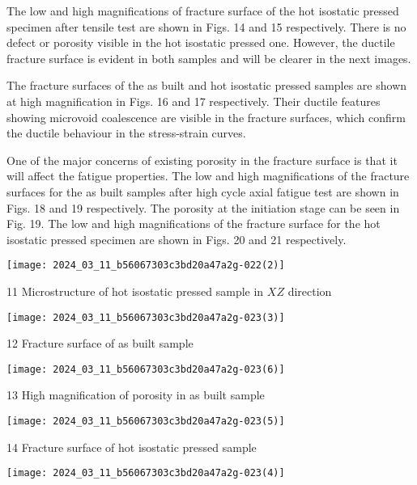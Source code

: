 \documentclass[10pt]{article}
\begin{document}
The low and high magnifications of fracture surface of the hot isostatic pressed specimen after tensile test are shown in Figs. 14 and 15 respectively. There is no defect or porosity visible in the hot isostatic pressed one. However, the ductile fracture surface is evident in both samples and will be clearer in the next images.

The fracture surfaces of the as built and hot isostatic pressed samples are shown at high magnification in Figs. 16 and 17 respectively. Their ductile features showing microvoid coalescence are visible in the fracture surfaces, which confirm the ductile behaviour in the stress-strain curves.

One of the major concerns of existing porosity in the fracture surface is that it will affect the fatigue properties. The low and high magnifications of the fracture surfaces for the as built samples after high cycle axial fatigue test are shown in Figs. 18 and 19 respectively. The porosity at the initiation stage can be seen in Fig. 19. The low and high magnifications of the fracture surface for the hot isostatic pressed specimen are shown in Figs. 20 and 21 respectively.

\begin{center}
\texttt{[image: 2024\_03\_11\_b56067303c3bd20a47a2g-022(2)]}
\end{center}

11 Microstructure of hot isostatic pressed sample in $X Z$ direction

\begin{center}
\texttt{[image: 2024\_03\_11\_b56067303c3bd20a47a2g-023(3)]}
\end{center}

12 Fracture surface of as built sample

\begin{center}
\texttt{[image: 2024\_03\_11\_b56067303c3bd20a47a2g-023(6)]}
\end{center}

13 High magnification of porosity in as built sample

\begin{center}
\texttt{[image: 2024\_03\_11\_b56067303c3bd20a47a2g-023(5)]}
\end{center}

14 Fracture surface of hot isostatic pressed sample

\begin{center}
\texttt{[image: 2024\_03\_11\_b56067303c3bd20a47a2g-023(4)]}
\end{center}
\end{document}
